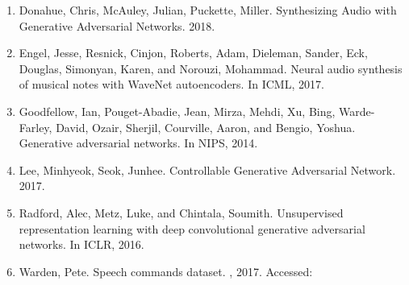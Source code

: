\documentclass{article}
\begin{document}
\begin{enumerate}

\item
  Donahue, Chris, McAuley, Julian, Puckette, Miller. Synthesizing Audio with Generative Adversarial Networks. 2018.
\item
  Engel, Jesse, Resnick, Cinjon, Roberts, Adam, Dieleman, Sander, Eck, Douglas, Simonyan, Karen, and Norouzi, Mohammad. Neural audio synthesis of musical notes with WaveNet autoencoders. In ICML, 2017.
\item
  Goodfellow, Ian, Pouget-Abadie, Jean, Mirza, Mehdi, Xu, Bing, Warde-Farley, David, Ozair, Sherjil, Courville, Aaron, and Bengio, Yoshua. Generative adversarial networks. In NIPS, 2014.
\item
  Lee, Minhyeok, Seok, Junhee. Controllable Generative Adversarial Network. 2017.
\item
  Radford, Alec, Metz, Luke, and Chintala, Soumith. Unsupervised representation learning with deep convolutional generative adversarial networks. In ICLR, 2016.
\item
  Warden, Pete. Speech commands dataset.
, 2017.
Accessed:

\end{enumerate}

\end{document}

